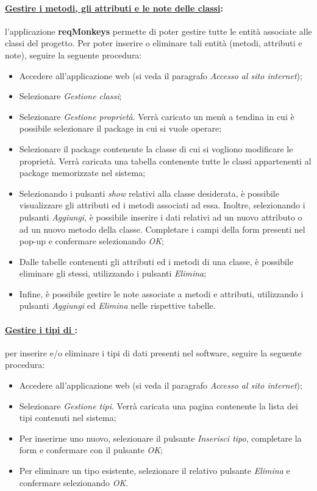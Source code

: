 \paragraph{\underline{Gestire i metodi, gli attributi e le note delle classi}:}
l'applicazione \textbf{reqMonkeys} permette di poter gestire tutte le entità associate alle classi del progetto. Per poter inserire o eliminare tali entità (metodi, attributi e note), seguire la seguente procedura:
\begin{itemize}
\item Accedere all'applicazione web (si veda il paragrafo \textit{Accesso al sito internet});
\item Selezionare \textit{Gestione classi};
\item Selezionare \textit{Gestione proprietà}. Verrà caricato un menù a tendina in cui è possibile selezionare il package\g{} in cui si vuole operare;
\item Selezionare il package\g{} contenente la classe di cui si vogliono modificare le proprietà. Verrà caricata una tabella contenente tutte le classi appartenenti al package\g{} memorizzate nel sistema;
\item Selezionando i pulsanti \textit{show} relativi alla classe desiderata, è possibile visualizzare gli attributi ed i metodi associati ad essa. Inoltre, selezionando i pulsanti \textit{Aggiungi}, è possibile inserire i dati relativi ad un nuovo attributo o ad un nuovo metodo della classe. Completare i campi della form presenti nel pop-up e confermare selezionando \textit{OK};
\item Dalle tabelle contenenti gli attributi ed i metodi di una classe, è possibile eliminare gli stessi, utilizzando i pulsanti \textit{Elimina};
\item Infine, è possibile gestire le note associate a metodi e attributi, utilizzando i pulsanti \textit{Aggiungi} ed \textit{Elimina} nelle rispettive tabelle.
\end{itemize}

\paragraph{\underline{Gestire i tipi di \project}:}
per inserire e/o eliminare i tipi di dati presenti nel software, seguire la seguente procedura:
\begin{itemize}
\item Accedere all'applicazione web (si veda il paragrafo \textit{Accesso al sito internet});
\item Selezionare \textit{Gestione tipi}. Verrà caricata una pagina contenente la lista dei tipi contenuti nel sistema;
\item Per inserirne uno nuovo, selezionare il pulsante \textit{Inserisci tipo}, completare la form e confermare con il pulsante \textit{OK};
\item Per eliminare un tipo esistente, selezionare il relativo pulsante \textit{Elimina} e confermare selezionando \textit{OK}.
\end{itemize}

